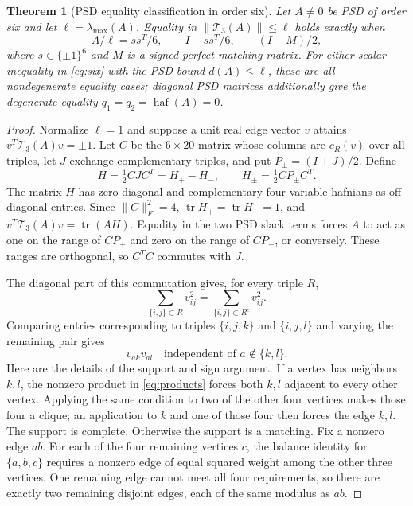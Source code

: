 \documentclass[11pt]{article}
\newtheorem{theorem}{Theorem}
\theoremstyle{remark}\newtheorem{remark}[theorem]{Remark}
\DeclareMathOperator{\haf}{haf}\DeclareMathOperator{\tr}{tr}
\begin{document}
\begin{theorem}[PSD equality classification in order six]\label{thm:equality}
Let $A\ne0$ be PSD of order six and let $\ell=\lambda_{\max}(A)$.  Equality in
$\|\mathcal T_3(A)\|\le\ell$ holds exactly when
\begin{equation}\label{eq:families}
\boxed{
A/\ell=ss^T/6,\qquad I-ss^T/6,\qquad (I+M)/2,
}
\end{equation}
where $s\in\{\pm1\}^6$ and $M$ is a signed perfect-matching matrix.  For either
scalar inequality in \eqref{eq:six} with the PSD bound $d(A)\le\ell$, these
are all nondegenerate equality cases; diagonal PSD matrices additionally give
the degenerate equality $q_1=q_2=\haf(A)=0$.
\end{theorem}
\begin{proof}
Normalize $\ell=1$ and suppose a unit real edge vector $v$ attains
$v^T\mathcal T_3(A)v=\pm1$.  Let $C$ be the $6\times20$ matrix whose columns
are $c_R(v)$ over all triples, let $J$ exchange complementary triples, and put
$P_\pm=(I\pm J)/2$.  Define
\[
H=\tfrac12CJC^T=H_+-H_-,\qquad H_\pm=\tfrac12CP_\pm C^T.
\]
The matrix $H$ has zero diagonal and complementary four-variable hafnians as
off-diagonal entries.  Since $\|C\|_F^2=4$,
$\tr H_+=\tr H_-=1$, and $v^T\mathcal T_3(A)v=\tr(AH)$.
Equality in the two PSD slack terms forces $A$ to act as one on the range of
$CP_+$ and zero on the range of $CP_-$, or conversely.  These ranges are
orthogonal, so $C^TC$ commutes with $J$.

The diagonal part of this commutation gives, for every triple $R$,
\begin{equation}\label{eq:balance}
\sum_{\{i,j\}\subset R}v_{ij}^2
=\sum_{\{i,j\}\subset R^c}v_{ij}^2.
\end{equation}
Comparing entries corresponding to triples $\{i,j,k\}$ and $\{i,j,l\}$ and
varying the remaining pair gives
\begin{equation}\label{eq:products}
v_{ak}v_{al}\quad\text{independent of }a\notin\{k,l\}.
\end{equation}
Here are the details of the support and sign argument. If a vertex has
neighbors $k,l$, the nonzero product in \eqref{eq:products} forces both
$k,l$ adjacent to every other vertex. Applying the same condition to two
of the other four vertices makes those four a clique; an application to
$k$ and one of those four then forces the edge $k,l$. The support is complete.
Otherwise the support is a matching. Fix a nonzero edge $ab$. For each of
the four remaining vertices $c$, the balance identity for $\{a,b,c\}$
requires a nonzero edge of equal squared weight among the other three
vertices. One remaining edge cannot meet all four requirements, so there
are exactly two remaining disjoint edges, each of the same modulus as $ab$.


\end{proof}
\end{document}
